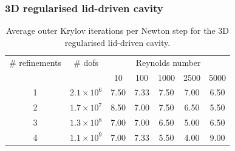 \documentclass[presentation, 10pt]{beamer}
\begin{document}
\begin{frame}
  \frametitle{3D regularised lid-driven cavity}
  \begin{table}
    \centering
    \begin{tabular}{cc|ccccc}
      \toprule
      \# refinements & \# dofs & \multicolumn{5}{c}{Reynolds number} \\
                     && 10 & 100 & 1000 & 2500 & 5000 \\
      \midrule
      1 & $2.1 \times 10^6$ & 7.50 & 7.33 & 7.50 & 7.00 & 6.50 \\
      2 & $1.7 \times 10^7$ & 8.50 & 7.00 & 7.50 & 6.50 & 5.50 \\
      3 & $1.3 \times 10^8$ & 7.00 & 7.00 & 6.50 & 5.00 & 6.50 \\
      4 & $1.1 \times 10^9$ & 7.00 & 7.33 & 5.50 & 4.00 & 9.00 \\
      \bottomrule
    \end{tabular}
    \caption{Average outer Krylov iterations per Newton step for the 3D regularised lid-driven cavity.}
  \end{table}
\end{frame}
\end{document}
